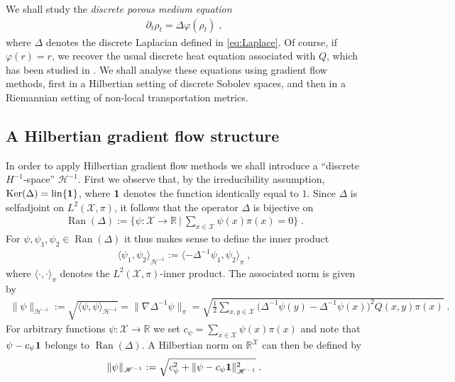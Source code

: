 \documentclass[a4paper,11pt,reqno]{amsart}
\theoremstyle{plain}
\theoremstyle{remark}
\numberwithin{equation}{section}
\begin{document}
We shall study the \emph{discrete porous medium equation}
\begin{align}\label{eq:pm}
 \partial_t \rho_t = \Delta {\varphi}(\rho_t)\;,
\end{align}
where $\Delta$ denotes the discrete Laplacian defined in
\eqref{eq:Laplace}.  Of course, if ${\varphi}(r) = r$, we recover the usual
discrete heat equation associated with $Q$, which has been studied in
\cite{CHLZ11,Ma11,Mie11a}.  We shall analyse these equations using gradient flow
methods, first in a Hilbertian setting of discrete Sobolev spaces, and
then in a Riemannian setting of non-local transportation metrics.

\subsection{A Hilbertian gradient flow structure}

In order to apply Hilbertian gradient flow methods we shall introduce
a ``discrete $H^{-1}$-space'' ${\mathscr{H}}^{-1}$.  First we observe that, by
the irreducibility assumption, $\operatorname{Ker}(\Delta) = \operatorname{lin}\{{{{\bf 1}}}\}$, where
${{{\bf 1}}}$ denotes the function identically equal to $1$. Since $\Delta$
is selfadjoint on $L^2({\mathcal{X}}, \pi)$, it follows that the operator
$\Delta$ is bijective on
\begin{align*}
 \operatorname{Ran}(\Delta) := \Big\{ \psi : {\mathcal{X}} \to {{\mathbb R}} \ | \ \sum_{x \in {\mathcal{X}}} \psi(x) \pi(x) = 0 \Big\}\;.
\end{align*}
For $\psi, \psi_1, \psi_2 \in \operatorname{Ran}(\Delta)$ it thus makes sense to
define the inner product
\begin{align*}
 {\langle {{\psi_1, \psi_2}}\rangle}_{{\mathscr{H}}^{-1}} := 
 {\langle {{-\Delta^{-1} \psi_1, \psi_2}}\rangle}_\pi\;,
\end{align*}
where ${\langle {{\cdot,\cdot}}\rangle}_\pi$ denotes the $L^2({\mathcal{X}},\pi)$-inner product. The associated norm is given by
\begin{align*}
 \| \psi \|_{{\mathscr{H}}^{-1}} 
   :=\sqrt{{\langle {{\psi, \psi}}\rangle}_{{\mathscr{H}}^{-1}}}
    = \| \nabla \Delta^{-1} \psi \|_{\pi}
    = \sqrt{
    \frac12\sum_{x,y\in {\mathcal{X}}} \big(\Delta^{-1}\psi(y)-\Delta^{-1}\psi(x)\big)^2Q(x,y) \pi(x)}\;.
\end{align*}
For arbitrary functions $\psi : {\mathcal{X}} \to {{\mathbb R}}$ we set $c_\psi = \sum_{x
  \in {\mathcal{X}}} \psi(x)\pi(x)$ and note that $\psi - c_\psi{{{\bf 1}}}$ belongs to
$\operatorname{Ran}(\Delta)$. A Hilbertian norm on ${{\mathbb R}}^{\mathcal{X}}$ can then be defined by
\begin{align*}
 \| \psi \|_{{\mathscr{H}}^{-1}}
    := \sqrt{c_\psi^2  + \| \psi - c_\psi{{{\bf 1}}}\|_{{\mathscr{H}}^{-1}}^2}\;.
\end{align*}
\end{document}
